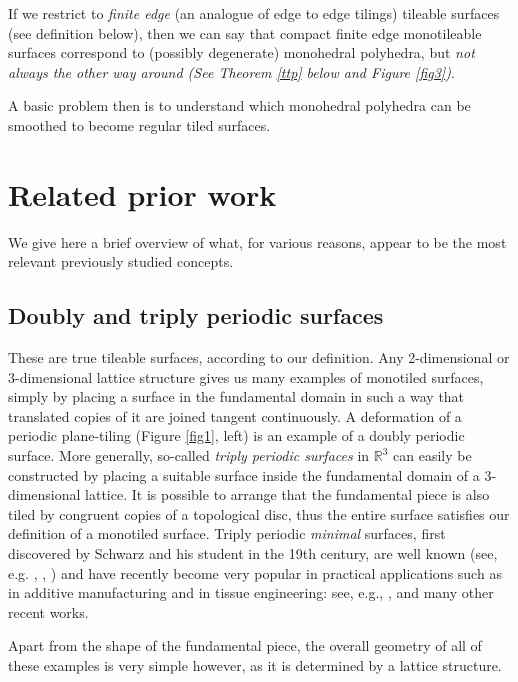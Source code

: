 \documentclass[11pt]{amsart}
\newcommand{\real}{\mathbb{R}}
\theoremstyle{remark}
\begin{document}
If we restrict to \emph{finite edge} (an analogue of edge to edge tilings) tileable surfaces (see definition below), then we can 
say that compact finite edge monotileable surfaces correspond to (possibly degenerate) monohedral polyhedra,
but \emph{not always the other way around (See Theorem \ref{ttp} below and Figure \ref{fig3})}.

A basic problem then is to understand which monohedral polyhedra can be smoothed to become regular tiled surfaces.








\section{Related prior work}  \label{review}
We give here a brief overview of what, for various reasons, appear to be the most relevant previously studied concepts.

\subsection{Doubly and triply periodic surfaces}
These are true tileable surfaces, according to our definition.
Any 2-dimensional or 3-dimensional lattice structure gives us many examples of monotiled surfaces, simply by placing
a surface in the fundamental domain in such a way that translated copies of it are joined tangent continuously.
A deformation of  a periodic plane-tiling (Figure \ref{fig1},  left) is an example of a doubly periodic surface.   More generally, so-called \emph{triply periodic surfaces} in $\real^3$ can easily be constructed by placing
a suitable surface inside  the fundamental domain of a 3-dimensional lattice.
It is possible to arrange that the fundamental piece is also tiled by congruent copies of a topological disc, 
thus the entire surface satisfies our definition of a monotiled surface.  Triply periodic \emph{minimal} surfaces, first discovered by Schwarz and his student in the 19th century, 
are well known (see, e.g. \cite{meeks1990theory}, \cite{karcher1996construction}, \cite{grosse2012triply}) and have  recently become very popular in practical applications such as in additive manufacturing and in tissue engineering:  see, e.g., \cite{rajagopalan2006schwarz}, \cite{feng2022triply} and many other recent works.

Apart from the shape of the fundamental piece, the overall geometry of all of these examples is very simple however, as it is determined by a lattice structure.  
\end{document}

